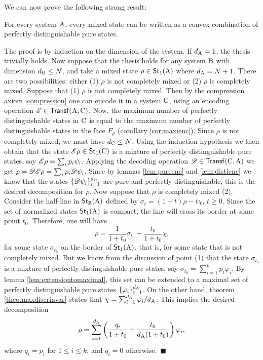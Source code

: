 \documentclass[12pt,aps,pra,showpacs,groupedaddress]{revtex4-1}
\def\Proof{\medskip\par\noindent{\bf Proof. }}
\def\qed{$\,\blacksquare$\par}
\def\rB{{\rm B}}
\def\rC{{\rm C}}
\def\Stset{{\mathsf{St}}}
\def\Trnset{{\mathsf{Transf}}}
\def\Reals{{\mathbb R}}
\begin{document}
We can now prove the following strong result:
\begin{theorem}
  For every system ${\rm A}$, every mixed state can be written as a convex combination of perfectly
  distinguishable pure states.
  \label{theo:diag}
\end{theorem}
\Proof The proof is by induction on the dimension of the system. If $d_{\rm A} =1$, the thesis trivially
holds. Now suppose that the thesis holds for any system $\rB$ with dimension $d_\rB\le N$, and take
a mixed state $\rho\in\Stset_1 (\rA)$ where $d_{\rm A} = N+1$. There are two possibilities: either (1)
$\rho$ is not completely mixed  or  (2) $\rho$ is completely mixed.  Suppose that (1) $\rho$ is
not completely mixed. Then by the compression axiom \ref{compression} one can encode it in a system
$\rC$, using an encoding operation $\tE \in\Trnset(\rA, \rC)$.  Now, the maximum number of perfectly
distinguishable states in $\rC$ is equal to the maximum number of perfectly distinguishable states
in the face $F_\rho$ (corollary \ref{cor:maxienc}).  Since $\rho$ is not completely mixed, we must
have $d_\rC\le N$.  Using the induction hypothesis we then obtain that the state $\tE \rho
\in\Stset_1 (\rC)$ is a mixture of perfectly distinguishable pure states, say $\mathscr E \rho = \sum_{i}
p_i \psi_i$.  Applying the decoding operation $\tD\in\Trnset(\rC,\rA)$ we get $\rho= \mathscr D\mathscr E \rho =
\sum_i p_i \mathscr D \psi_i$.  Since by lemmas \ref{lem:pureenc} and \ref{lem:distienc} we know that the
states $\{\tD \psi_i\}_{i=1}^{d_\rC}$ are pure and perfectly distinguishable, this is the desired decomposition
for $\rho$.  Now suppose that $\rho$ is completely mixed (2).  Consider the half-line in
$\Stset_\Reals (\rA)$ defined by $\sigma_t = (1+t) \rho - t\chi$, $t \ge0$. Since the set of
normalized states $\Stset_1(\rA)$ is compact, the line will cross its border at some point $t_0$.
Therefore, one will have
\begin{equation*}
  \rho = \frac{1}{1+t_0} \sigma_{t_0} + \frac{t_0}{1+t_0}  \chi.   
\end{equation*}
for some state $\sigma_{t_0}$ on the border of $\Stset_1 (\rA)$, that is, for some state that is not
completely mixed.  But we know from the discussion of point (1) that the state $\sigma_{t_0}$ is a
mixture of perfectly distinguishable pure states, say $\sigma_{t_0} = \sum_{i=1}^k p_i \varphi_i$.
By lemma \ref{lem:extensiontomaximal}, this set can be extended to a maximal set of perfectly
distinguishable pure states $\{\varphi_i\}_{i=1}^{d_{\rm A}}$.  On the other hand, theorem
\ref{theo:maxdiscrinvar} states that $\chi=\sum_{i=1}^{d_{\rm A}} \varphi_i/d_{{\rm A}}$. This implies the
desired decomposition
\begin{equation*}
  \rho = \sum_{i=1}^{d_\rA}  \left(\frac{q_i}{1+t_0}  + \frac{t_0}{d_\rA (1+t_0)} \right) \varphi_i ,
\end{equation*}
where $q_i=p_i$ for $1\leq i\leq k$, and $q_i=0$ otherwise.
\qed
\end{document}
